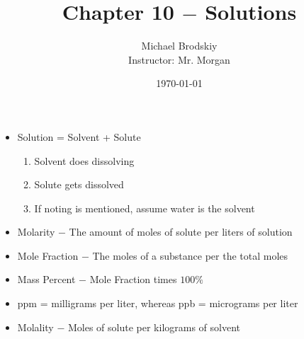 \documentclass[12pt]{article}
\title{Chapter 10 $-$ Solutions}
\date{\today}
\author{Michael Brodskiy\\ \small Instructor: Mr. Morgan}
\begin{document}
\maketitle

\begin{itemize}

  \item Solution = Solvent + Solute

    \begin{enumerate}

      \item Solvent does dissolving

      \item Solute gets dissolved

      \item If noting is mentioned, assume water is the solvent

    \end{enumerate}

  \item Molarity $-$ The amount of moles of solute per liters of solution

  \item Mole Fraction $-$ The moles of a substance per the total moles

  \item Mass Percent $-$ Mole Fraction times $100\% $

  \item ppm = milligrams per liter, whereas ppb = micrograms per liter

  \item Molality $-$ Moles of solute per kilograms of solvent

\end{itemize}
\end{document}
